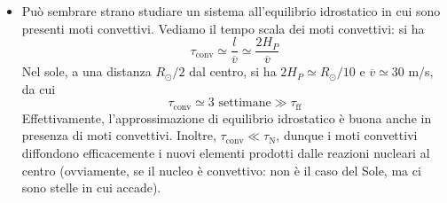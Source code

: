 \documentclass[a4paper,11pt]{article}
\newcommand{\s}{_\odot}
\theoremstyle{theorem}
\theoremstyle{definition}
\begin{document}
\begin{itemize}
		\item Può sembrare strano studiare un sistema all'equilibrio idrostatico in cui sono presenti moti convettivi. Vediamo il tempo scala dei moti convettivi: si ha
		\[\tau_\textrm{conv}\simeq\frac{l}{\overline{v}}\simeq\frac{2H_P}{\overline{v}}\]
		Nel sole, a una distanza $R\s/2$ dal centro, si ha $2H_P\simeq R\s/10$ e $\overline{v}\simeq 30$ m/s, da cui
		\[\tau_\textrm{conv}\simeq3\textrm{ settimane}\gg\tau_{\textrm{ff}}\]
		Effettivamente, l'approssimazione di equilibrio idrostatico è buona anche in presenza di moti convettivi. Inoltre, $\tau_\textrm{conv}\ll\tau_\textrm{N}$, dunque i moti convettivi diffondono efficacemente i nuovi elementi prodotti dalle reazioni nucleari al centro (ovviamente, se il nucleo è convettivo: non è il caso del Sole, ma ci sono stelle in cui accade).
	\end{itemize}
\end{document}
